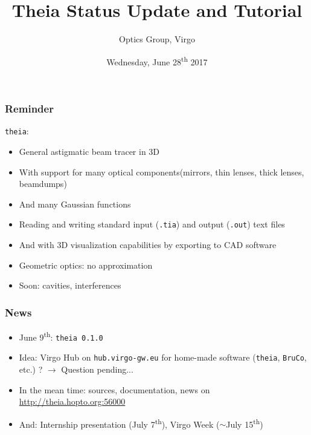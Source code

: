 \documentclass{beamer}
\title{Theia Status Update and Tutorial}
\author{Optics Group, Virgo}
\date{Wednesday, June 28\textsuperscript{th} 2017} %
\begin{document}
\begin{frame}
\titlepage %
\end{frame}





\begin{frame}
\frametitle{Reminder}

\texttt{theia}:

\begin{itemize}
\item General astigmatic beam tracer in 3D
\item With support for many optical components(mirrors, thin lenses, thick lenses, beamdumps)
\item And many Gaussian functions

\item Reading and writing standard input (\texttt{.tia}) and output (\texttt{.out}) text files
\item And with 3D visualization capabilities by exporting to CAD software

\item Geometric optics: no approximation
\item Soon: cavities, interferences
\end{itemize}
\end{frame}

\begin{frame}
\frametitle{News}

\begin{itemize}
\item June 9\textsuperscript{th}: \texttt{theia 0.1.0}
\item Idea: Virgo Hub on \texttt{hub.virgo-gw.eu} for home-made software (\texttt{theia}, \texttt{BruCo}, etc.) ? $\rightarrow$ Question pending...
\item In the mean time: sources, documentation, news on \url{http://theia.hopto.org:56000}

\item And: Internship presentation (July 7\textsuperscript{th}), Virgo Week ($\sim$July 15\textsuperscript{th})
\end{itemize}
\end{frame}
\end{document}
